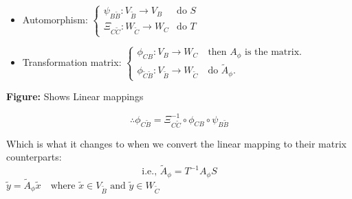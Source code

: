 \documentclass[12pt]{article}
\begin{document}
\begin{itemize}
    \item  Automorphism:
    $\begin{cases}
        \psi_{B\tilde{B}} : V_{\tilde{B}} \to V_{B} & \text{do } S \\
        \Xi_{C\tilde{C}} : W_{\tilde{C}} \to W_{C} & \text{do } T
    \end{cases}$
    \item Transformation matrix:
    $\begin{cases}
        \phi_{{C}{B}}: V_{{B}} \to W_{{C}}
        \quad 
        \text{then    } {A}_\phi \text{ is the matrix.}\\
        \phi_{\tilde{C}\tilde{B}}: V_{\tilde{B}} \to W_{\tilde{C}}       \quad \text{do }  \tilde{A}_\phi .
    \end{cases}$
\end{itemize}

\begin{center}

\vspace{0.5em}
\textbf{Figure:} Shows Linear mappings
\end{center}

$$
\therefore \phi_{C\tilde{B}} = \Xi_{C\tilde{C}}^{-1} \circ \phi_{CB} \circ \psi_{B\tilde{B}}
$$

Which is what it changes to when we convert the linear mapping to their matrix counterparts:
$$
\text{i.e., }
\tilde{A}_\phi = T^{-1} A_\phi S
$$
\newpage
$
\tilde{y} = \tilde{A}_\phi \tilde{x} \quad \text{where } \tilde{x} \in V_{\tilde{B}} \text{ and } \tilde{y} \in W_{\tilde{C}}
$
\end{document}
